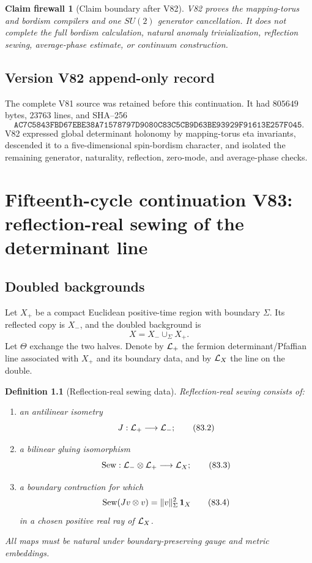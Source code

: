 \documentclass[11pt]{article}
\newtheorem{definition}[theorem]{Definition}
\newtheorem{firewall}[theorem]{Claim firewall}
\theoremstyle{remark}
\begin{document}
\begin{firewall}[Claim boundary after V82]
\label{fire:v15v82}
V82 proves the mapping-torus and bordism compilers and one
\(SU(2)\) generator cancellation.  It does not complete the full
bordism calculation, natural anomaly trivialization, reflection
sewing, average-phase estimate, or continuum construction.
\end{firewall}

\section*{Version V82 append-only record}
The complete V81 source was retained before this continuation.  It
had \(805649\) bytes, \(23763\) lines, and SHA--256
\[
 \texttt{AC7C5843FBD67EBE38A71578797D9080C83C5CB9D63BE93929F91613E257F045}.
\]
V82 expressed global determinant holonomy by mapping-torus eta
invariants, descended it to a five-dimensional spin-bordism
character, and isolated the remaining generator, naturality,
reflection, zero-mode, and average-phase checks.

\chapter{Fifteenth-cycle continuation V83: reflection-real sewing of the determinant line}
\label{sec:v15v83}

\section{Doubled backgrounds}

Let \(X_+\) be a compact Euclidean positive-time region with
boundary \(\Sigma\).  Its reflected copy is \(X_-\), and the doubled
background is
\[
 X=X_-\cup_\Sigma X_+.                               \tag{83.1}
\]
Let \(\Theta\) exchange the two halves.  Denote by
\({\cal L}_+\) the fermion determinant/Pfaffian line associated
with \(X_+\) and its boundary data, and by \({\cal L}_X\) the line
on the double.

\begin{definition}[Reflection-real sewing data]
\label{def:v15v83-sewing}
Reflection-real sewing consists of:
\begin{enumerate}
\item an antilinear isometry
\[
 J:{\cal L}_+\longrightarrow{\cal L}_-;
                                                               \tag{83.2}
\]
\item a bilinear gluing isomorphism
\[
 {\rm Sew}:{\cal L}_-\otimes{\cal L}_+
 \longrightarrow{\cal L}_X;                           \tag{83.3}
\]
\item a boundary contraction for which
\[
 {\rm Sew}(Jv\otimes v)=\|v\|_\Sigma^2\,{\bf1}_X      \tag{83.4}
\]
in a chosen positive real ray of \({\cal L}_X\).
\end{enumerate}
All maps must be natural under boundary-preserving gauge and
metric embeddings.
\end{definition}
\end{document}
